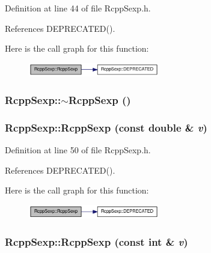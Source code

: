 Definition at line 44 of file RcppSexp.h.

References DEPRECATED().

Here is the call graph for this function:\nopagebreak
\begin{figure}[H]
\begin{center}
\leavevmode
\includegraphics[width=162pt]{classRcppSexp_a37253a883401c9714dbd3ec50e0f78a1_cgraph}
\end{center}
\end{figure}
\hypertarget{classRcppSexp_a54cb551beed3570ca0a1aa0566d512cf}{
\subsubsection[{$\sim$RcppSexp}]{\setlength{\rightskip}{0pt plus 5cm}RcppSexp::$\sim$RcppSexp ()}}
\label{classRcppSexp_a54cb551beed3570ca0a1aa0566d512cf}
\hypertarget{classRcppSexp_acf6fc00ffd9616dea4926baf40e6f77d}{
\subsubsection[{RcppSexp}]{\setlength{\rightskip}{0pt plus 5cm}RcppSexp::RcppSexp (const double \& {\em v})}}
\label{classRcppSexp_acf6fc00ffd9616dea4926baf40e6f77d}


Definition at line 50 of file RcppSexp.h.

References DEPRECATED().

Here is the call graph for this function:\nopagebreak
\begin{figure}[H]
\begin{center}
\leavevmode
\includegraphics[width=162pt]{classRcppSexp_acf6fc00ffd9616dea4926baf40e6f77d_cgraph}
\end{center}
\end{figure}
\hypertarget{classRcppSexp_a2ddf3900d04a52a59e15faebe83a4e8b}{
\subsubsection[{RcppSexp}]{\setlength{\rightskip}{0pt plus 5cm}RcppSexp::RcppSexp (const int \& {\em v})}}
\label{classRcppSexp_a2ddf3900d04a52a59e15faebe83a4e8b}


